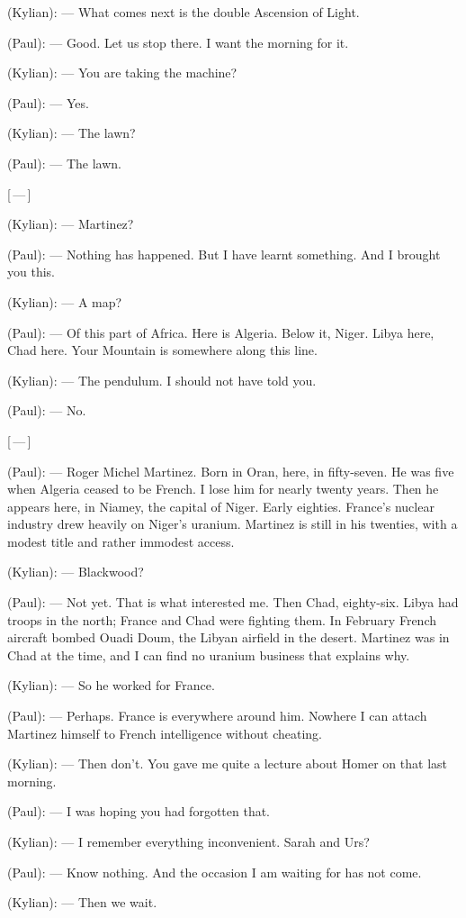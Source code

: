 \begin{room}

(Kylian): --- What comes next is the double Ascension of Light.

(Paul): --- Good. Let us stop there. I want the morning for it.

(Kylian): --- You are taking the machine?

(Paul): --- Yes.

(Kylian): --- The lawn?

(Paul): --- The lawn.

\centerline{[\,---\,]}

(Kylian): --- Martinez?

(Paul): --- Nothing has happened. But I have learnt something. And I brought you this.

(Kylian): --- A map?

(Paul): --- Of this part of Africa. Here is Algeria. Below it, Niger. Libya here, Chad here. Your Mountain is somewhere along this line.

(Kylian): --- The pendulum. I should not have told you.

(Paul): --- No.

\centerline{[\,---\,]}

(Paul): --- Roger Michel Martinez. Born in Oran, here, in fifty-seven. He was five when Algeria ceased to be French. I lose him for nearly twenty years. Then he appears here, in Niamey, the capital of Niger. Early eighties. France's nuclear industry drew heavily on Niger's uranium. Martinez is still in his twenties, with a modest title and rather immodest access.

(Kylian): --- Blackwood?

(Paul): --- Not yet. That is what interested me. Then Chad, eighty-six. Libya had troops in the north; France and Chad were fighting them. In February French aircraft bombed Ouadi Doum, the Libyan airfield in the desert. Martinez was in Chad at the time, and I can find no uranium business that explains why.

(Kylian): --- So he worked for France.

(Paul): --- Perhaps. France is everywhere around him. Nowhere I can attach Martinez himself to French intelligence without cheating.

(Kylian): --- Then don't. You gave me quite a lecture about Homer on that last morning.

(Paul): --- I was hoping you had forgotten that.

(Kylian): --- I remember everything inconvenient. Sarah and Urs?

(Paul): --- Know nothing. And the occasion I am waiting for has not come.

(Kylian): --- Then we wait.

\end{room}
